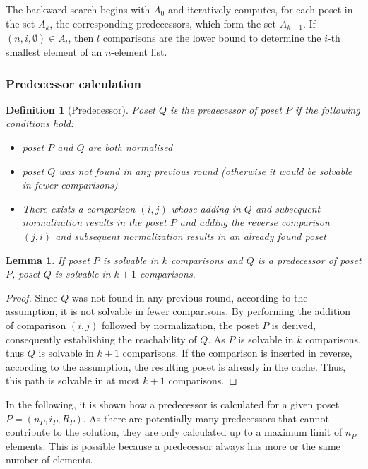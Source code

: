 \documentclass[10pt,journal,compsoc]{IEEEtran}
\newtheorem{lemma}{Lemma}
\newtheorem{definition}{Definition}
\begin{document}
The backward search begins with $A_0$ and iteratively computes, for each poset in the set $A_k$, the corresponding predecessors, which form the set $A_{k + 1}$.
If $(n, i, \emptyset) \in A_l$, then $l$ comparisons are the lower bound to determine the $i$-th smallest element of an $n$-element list.


\subsubsection{Predecessor calculation} \label{sec:backward:predecessor_calculation}

\begin{definition}[Predecessor] \label{definition:predecessor_calculation}
  Poset $Q$ is the predecessor of poset $P$ if the following conditions hold:
  \begin{itemize}
    \item poset $P$ and $Q$ are both normalised
    \item poset $Q$ was not found in any previous round (otherwise it would be solvable in fewer comparisons)
    \item There exists a comparison $(i, j)$ whose adding in $Q$ and subsequent normalization results in the poset $P$ and adding the reverse comparison $(j, i)$ and subsequent normalization results in an already found poset
  \end{itemize}
\end{definition}

\begin{lemma} \label{lemma:predecessor_calculation}
  If poset $P$ is solvable in $k$ comparisons and $Q$ is a predecessor of poset $P$, poset $Q$ is solvable in $k + 1$ comparisons.
\end{lemma}

\begin{proof} \label{proof:predecessor_calculation}
  Since $Q$ was not found in any previous round, according to the assumption, it is not solvable in fewer comparisons.
  By performing the addition of comparison $(i, j)$ followed by normalization, the poset $P$ is derived, consequently establishing the reachability of $Q$.
  As $P$ is solvable in $k$ comparisons, thus $Q$ is solvable in $k + 1$ comparisons.
  If the comparison is inserted in reverse, according to the assumption, the resulting poset is already in the cache.
  Thus, this path is solvable in at most $k + 1$ comparisons.
\end{proof}

In the following, it is shown how a predecessor is calculated for a given poset $P = (n_P, i_P, R_P)$. As there are potentially many predecessors that cannot contribute to the solution, they are only calculated up to a maximum limit of $n_P$ elements. This is possible because a predecessor always has more or the same number of elements.
\end{document}
